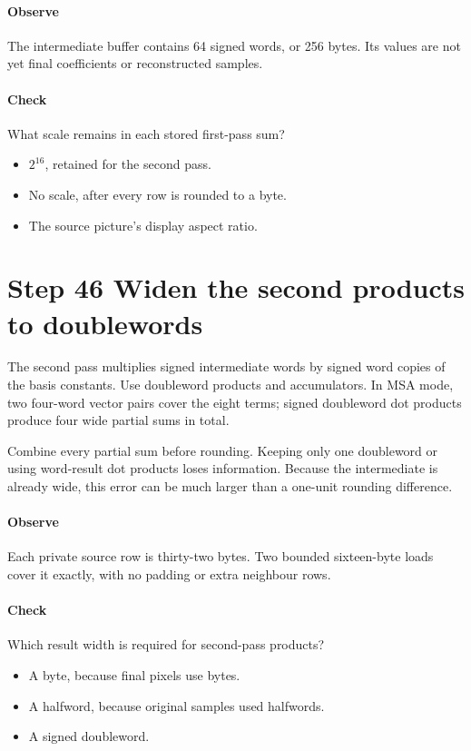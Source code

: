 \paragraph{Observe} The intermediate buffer contains 64 signed words, or 256
bytes. Its values are not yet final coefficients or reconstructed samples.
\paragraph{Check} What scale remains in each stored first-pass sum?
\begin{itemize}
  \item[A.] $2^{16}$, retained for the second pass.
  \item[B.] No scale, after every row is rounded to a byte.
  \item[C.] The source picture's display aspect ratio.
\end{itemize}

\section{Step 46 Widen the second products to doublewords}\label{h263-transform-s06}
The second pass multiplies signed intermediate words by signed word copies of
the basis constants. Use doubleword products and accumulators. In MSA mode,
two four-word vector pairs cover the eight terms; signed doubleword dot products
produce four wide partial sums in total.

Combine every partial sum before rounding. Keeping only one doubleword or using
word-result dot products loses information. Because the intermediate is already
wide, this error can be much larger than a one-unit rounding difference.

\paragraph{Observe} Each private source row is thirty-two bytes. Two bounded
sixteen-byte loads cover it exactly, with no padding or extra neighbour rows.
\paragraph{Check} Which result width is required for second-pass products?
\begin{itemize}
  \item[A.] A byte, because final pixels use bytes.
  \item[B.] A halfword, because original samples used halfwords.
  \item[C.] A signed doubleword.
\end{itemize}

